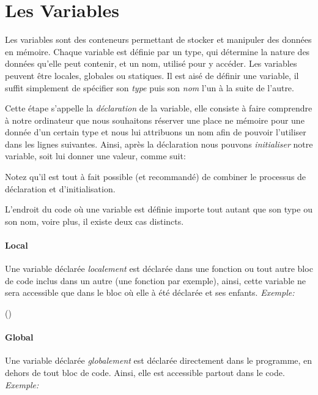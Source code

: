 \section{Les Variables}
Les variables sont des conteneurs permettant de stocker et manipuler des données en mémoire. Chaque variable est définie par un type, qui détermine la nature des données qu’elle peut contenir, et un nom, utilisé pour y accéder. Les variables peuvent être locales, globales ou statiques. Il est aisé de définir une variable, il suffit simplement de spécifier son \emph{type} puis son \emph{nom} l'un à la suite de l'autre.



Cette étape s'appelle la \emph{déclaration} de la variable, elle consiste à faire comprendre à notre ordinateur que nous souhaitons réserver une place ne mémoire pour une donnée d'un certain type et nous lui attribuons un nom afin de pouvoir l'utiliser dans les lignes suivantes. Ainsi, après la déclaration nous pouvons \emph{initialiser} notre variable, soit lui donner une valeur, comme suit:



Notez qu'il est tout à fait possible (et recommandé) de combiner le processus de déclaration et d'initialisation.



L'endroit du code où une variable est définie importe tout autant que son type ou son nom, voire plus, il existe deux cas distincts.

\paragraph{Local}
Une variable déclarée \emph{localement} est déclarée dans une fonction ou tout autre bloc de code inclus dans un autre (une fonction par exemple), ainsi, cette variable ne sera accessible que dans le bloc où elle à été déclarée et ses enfants. \emph{Exemple:}

()

\paragraph{Global}
Une variable déclarée \emph{globalement} est déclarée directement dans le programme, en dehors de tout bloc de code. Ainsi, elle est accessible partout dans le code. \emph{Exemple:}

